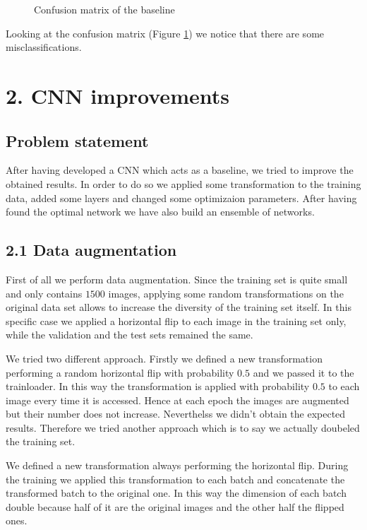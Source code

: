 \documentclass[12pt, a4paper]{report}
\begin{document}
\begin{figure}[h!]
	\centering
	\caption{Confusion matrix of the baseline}
	\label{fig:baselinecmatrix}
\end{figure}

Looking at the confusion matrix (Figure \ref{fig:baselinecmatrix}) we notice that there are some misclassifications.

\section*{2. CNN improvements}

\subsection*{Problem statement}
After having developed a CNN which acts as a baseline, we tried to improve the obtained results. In order to do so we applied some transformation to the training data, added some layers and changed some optimizaion parameters. After having found the optimal network we have also build an ensemble of networks.

\subsection*{2.1 Data augmentation}

First of all we perform data augmentation. Since the training set is quite small and only contains $1500$ images, applying some random transformations on the original data set allows to increase the diversity of the training set itself. In this specific case we applied a horizontal flip to each image in the training set only, while the validation and the test sets remained the same.

We tried two different approach. Firstly we defined a new transformation performing a random horizontal flip with probability $0.5$ and we passed it to the trainloader. In this way the transformation is applied with probability $0.5$ to each image every time it is accessed. Hence at each epoch the images are augmented but their number does not increase. Neverthelss we didn't obtain the expected results. Therefore we tried another approach which is to say we actually doubeled the training set. 

We defined a new transformation always performing the horizontal flip. During the training we applied this transformation to each batch and concatenate the transformed batch to the original one. In this way the dimension of each batch double because half of it are the original images and the other half the flipped ones.
\end{document}
